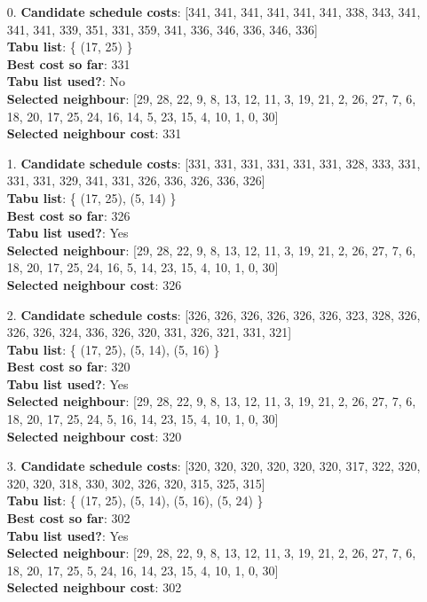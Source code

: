 \documentclass[fleqn]{article}
\begin{document}
  \begin{itemize}

    \item[0.] \textbf{Candidate schedule costs}: [341, 341, 341, 341, 341, 341, 338, 343, 341, 341, 341, 339, 351, 331, 359, 341, 336, 346, 336, 346, 336] \\
    \textbf{Tabu list}: \{ (17, 25) \} \\
    \textbf{Best cost so far}: 331 \\
    \textbf{Tabu list used?}: No \\
    \textbf{Selected neighbour}: [29, 28, 22, 9, 8, 13, 12, 11, 3, 19, 21, 2, 26, 27, 7, 6, 18, 20, 17, 25, 24, 16, 14, 5, 23, 15, 4, 10, 1, 0, 30] \\
    \textbf{Selected neighbour cost}: 331
      

    \item[1.] \textbf{Candidate schedule costs}: [331, 331, 331, 331, 331, 331, 328, 333, 331, 331, 331, 329, 341, 331, 326, 336, 326, 336, 326] \\
    \textbf{Tabu list}: \{ (17, 25), (5, 14) \} \\
    \textbf{Best cost so far}: 326 \\
    \textbf{Tabu list used?}: Yes \\
    \textbf{Selected neighbour}: [29, 28, 22, 9, 8, 13, 12, 11, 3, 19, 21, 2, 26, 27, 7, 6, 18, 20, 17, 25, 24, 16, 5, 14, 23, 15, 4, 10, 1, 0, 30] \\
    \textbf{Selected neighbour cost}: 326
      

    \item[2.] \textbf{Candidate schedule costs}: [326, 326, 326, 326, 326, 326, 323, 328, 326, 326, 326, 324, 336, 326, 320, 331, 326, 321, 331, 321] \\
    \textbf{Tabu list}: \{ (17, 25), (5, 14), (5, 16) \} \\
    \textbf{Best cost so far}: 320 \\
    \textbf{Tabu list used?}: Yes \\
    \textbf{Selected neighbour}: [29, 28, 22, 9, 8, 13, 12, 11, 3, 19, 21, 2, 26, 27, 7, 6, 18, 20, 17, 25, 24, 5, 16, 14, 23, 15, 4, 10, 1, 0, 30] \\
    \textbf{Selected neighbour cost}: 320
      

    \item[3.] \textbf{Candidate schedule costs}: [320, 320, 320, 320, 320, 320, 317, 322, 320, 320, 320, 318, 330, 302, 326, 320, 315, 325, 315] \\
    \textbf{Tabu list}: \{ (17, 25), (5, 14), (5, 16), (5, 24) \} \\
    \textbf{Best cost so far}: 302 \\
    \textbf{Tabu list used?}: Yes \\
    \textbf{Selected neighbour}: [29, 28, 22, 9, 8, 13, 12, 11, 3, 19, 21, 2, 26, 27, 7, 6, 18, 20, 17, 25, 5, 24, 16, 14, 23, 15, 4, 10, 1, 0, 30] \\
    \textbf{Selected neighbour cost}: 302
      


\end{itemize}
\end{document}
